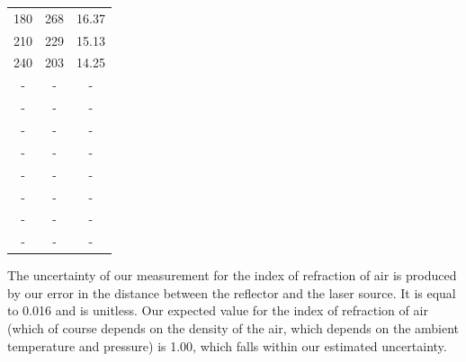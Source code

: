 \documentclass{amsart}
\begin{document}
\begin{table}[H]
\begin{minipage}{0.49\textwidth}
\begin{tabular}{c|c|c}
            180      & 268                                            & 16.37                                                          \\
            210      & 229                                            & 15.13                                                          \\
            240      & 203                                            & 14.25                                                          \\
             -       &  -                                             &   -                                                            \\
             -       &  -                                             &   -                                                            \\
             -       &  -                                             &   -                                                            \\
             -       &  -                                             &   -                                                            \\
             -       &  -                                             &   -                                                            \\
             -       &  -                                             &   -                                                            \\
             -       &  -                                             &   -                                                            \\
             -       &  -                                             &   -                                                            \\
        \end{tabular}
    \end{minipage}
\end{table}

The uncertainty of our measurement for the index of refraction of air is produced by our error in the distance between the reflector and the laser source. It is equal to 0.016 and is unitless. Our expected value for the index of refraction of air (which of course depends on the density of the air, which depends on the ambient temperature and pressure) is 1.00, which falls within our estimated uncertainty.
\end{document}
